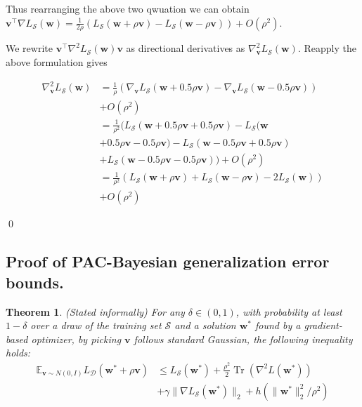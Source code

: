 \documentclass[letterpaper]{article} %
\theoremstyle{plain}
\newtheorem{theorem}{Theorem}
\theoremstyle{definition}
\begin{document}
Thus rearranging the above two qwuation we can obtain $\boldsymbol{v}^{\top} \nabla L_{\mathcal{S}}(\boldsymbol{w}) =\frac{1}{2\rho} (L_{\mathcal{S}}(\boldsymbol{w} + \rho\boldsymbol{v})- L_{\mathcal{S}}(\boldsymbol{w} - \rho\boldsymbol{v}))+O\left(\rho^2\right)$.

We rewrite $\boldsymbol{v}^{\top} \nabla^2 L_{\mathcal{S}}(\boldsymbol{w}) \boldsymbol{v} $ as directional derivatives as $\nabla_{\boldsymbol{v}}^{2} L_{\mathcal{S}}(\boldsymbol{w})$. Reapply the above formulation gives

\begin{align*}
    \nabla_{\boldsymbol{v}}^{2} L_{\mathcal{S}}(\boldsymbol{w}) &= \frac{1}{\rho} (\nabla_{\boldsymbol{v}} L_{\mathcal{S}}(\boldsymbol{w} + 0.5\rho\boldsymbol{v})- \nabla_{\boldsymbol{v}} L_{\mathcal{S}}(\boldsymbol{w} - 0.5\rho\boldsymbol{v})) \\
    &+O\left(\rho^2\right) \\
    &= \frac{1}{\rho^2} (L_{\mathcal{S}}(\boldsymbol{w} + 0.5\rho\boldsymbol{v}+ 0.5\rho\boldsymbol{v}) - L_{\mathcal{S}}(\boldsymbol{w}\\
    & + 0.5\rho\boldsymbol{v}- 0.5\rho\boldsymbol{v}) - L_{\mathcal{S}}(\boldsymbol{w} - 0.5\rho\boldsymbol{v} + 0.5\rho\boldsymbol{v}) \\
    &+ L_{\mathcal{S}}(\boldsymbol{w} - 0.5\rho\boldsymbol{v} - 0.5\rho\boldsymbol{v}))+O\left(\rho^2\right) \\
    &= \frac{1}{\rho^2} (L_{\mathcal{S}}(\boldsymbol{w} + \rho\boldsymbol{v})+ L_{\mathcal{S}}(\boldsymbol{w} -\rho\boldsymbol{v})- 2L_{\mathcal{S}}(\boldsymbol{w})) \\
    &+O\left(\rho^2\right)
\end{align*}

\qed

\subsection{Proof of PAC-Bayesian generalization error bounds.}
\begin{theorem} \label{theorem:bound}
(Stated informally) For any $\delta \in(0,1)$, with probability at least $1-\delta$ over a draw of the training set $\mathcal{S}$ and a solution $\boldsymbol{w^*}$ found by a gradient-based optimizer, by picking $\boldsymbol{v}$ follows standard Gaussian, the following inequality holds:
\begin{align*} 
\mathbb{E}_{\boldsymbol{v} \sim N(0, I)} L_{\mathcal{D}}(\boldsymbol{w^*}+\rho \boldsymbol{v}) &\leq L_{\mathcal{S}}(\boldsymbol{w^*}) + \frac{\rho^2}{2} \operatorname{Tr}\left(\nabla^2 L\left(\boldsymbol{w^*}\right)\right) \\
& + \gamma\|\nabla L_{\mathcal{S}}(\boldsymbol{w^*})\|_2  + 
h\left(\|\boldsymbol{w^*}\|_2^2 / \rho^2\right) \nonumber
\end{align*}
\end{theorem}
\end{document}
